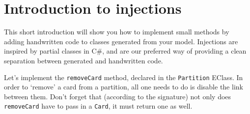 \newpage
\chapter{Introduction to injections}
\genHeader

This short introduction will show you how to implement small methods by adding handwritten code to classes generated from your model. Injections are inspired by
partial classes in C\#, and are our preferred way of providing a clean separation between generated and handwritten code. 

Let's implement the \texttt{removeCard} method, declared in the \texttt{Partition} EClass. In order to `remove' a card from a partition, all one needs to do is
disable the link between them. Don't forget that (according to the signature) not only does \texttt{removeCard} have to pass in a \texttt{Card}, it must return
one as well.

